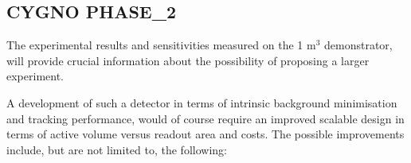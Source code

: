 \documentclass[physics,article,submit,moreauthors,pdftex]{Definitions/mdpi}
\begin{document}




\subsection{CYGNO PHASE\_2}


The experimental results and sensitivities measured on the 1 m$^3$ demonstrator, will provide crucial information about the possibility of proposing a larger experiment.

A  development of such a detector in terms of intrinsic background minimisation and tracking performance, would of course require an improved scalable design in terms of active volume versus readout area and costs. The possible improvements include, but are not limited to, the following:
\end{document}
